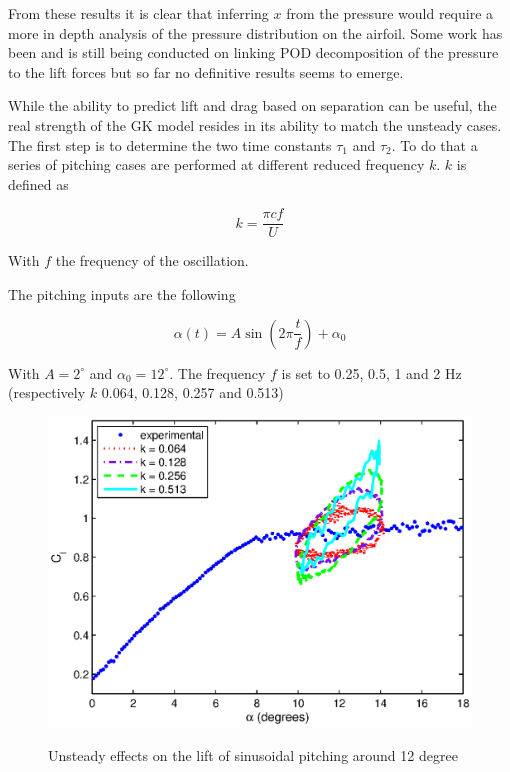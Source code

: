\par From these results it is clear that inferring $x$ from the pressure would require a more in depth analysis of the pressure distribution on the airfoil.
Some work has been and is still being conducted on linking POD decomposition of the pressure to the lift forces but so far no definitive results seems to emerge.



While the ability to predict lift and drag based on separation can be useful, the real strength of the GK model resides in its ability to match the unsteady cases.
The first step is to determine the two time constants $\tau_1$ and $\tau_2$. 
To do that a series of pitching cases are performed at different reduced frequency $k$.
$k$ is defined as

\begin{equation}
  k=\frac{\pi c f}{U}
\end{equation}

With $f$ the frequency of the oscillation.

\par The pitching inputs are the following

\begin{equation}
	\alpha\left( t \right)= A \sin \left( 2 \pi \frac{t}{f} \right) + \alpha_0
	\label{eqn:pitch_input}
\end{equation}

With $A=2^\circ$ and $\alpha_0=12^\circ$.
The frequency $f$ is set to 0.25, 0.5, 1 and 2 Hz (respectively $k$ 0.064, 0.128, 0.257 and 0.513)

\begin{figure}[h]
  \begin{center}
    \scalebox{0.9}  
    {\includegraphics{./Figures/Pitching_allcases_CL_12_amp_2.eps}}
  \end{center}
  \caption{Unsteady effects on the lift of sinusoidal pitching around 12 degree} 
  \label{fig:Pitching_allcases_Cl_12}
\end{figure}

